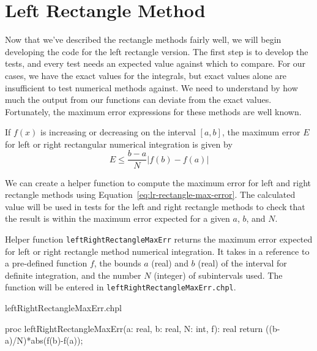 \section{Left Rectangle Method}
\begin{seamlessnote}
  Now that we've described the rectangle methods fairly well, we will begin developing the code 
  for the left rectangle version.  The first step is to develop the tests, and
  every test needs an expected value against which to compare. For our cases, we have the exact
  values for the integrals, but exact values alone are insufficient to test numerical methods
  against. We need to understand by how much the output from our functions can deviate from
  the exact values. Fortunately, the maximum error expressions for these methods are well
  known.
\end{seamlessnote}

If $f(x)$ is increasing or decreasing on the interval $[a,b]$, the maximum error $E$ 
for left or right rectangular numerical integration is given by
\begin{equation}
  E \leq \frac{b-a}{N}\left|f(b)-f(a)\right| \label{eq:lr-rectangle-max-error}
\end{equation}

We can create a helper function to compute the maximum error for left and right rectangle
methods using Equation~\ref{eq:lr-rectangle-max-error}. The calculated value will be used
in tests for the left and right rectangle methods to check that the result is within 
the maximum error expected for a given $a$, $b$, and $N$. 
\begin{enumspec}
\item{} Helper function \lstinline{leftRightRectangleMaxErr} returns the
  maximum error expected for left or right rectangle method numerical integration. It 
  takes in a reference to a pre-defined function $f$, the bounds $a$ (real) and $b$ (real) of the 
  interval for definite integration, and the number $N$ (integer) of subintervals used.
  The function will be entered in \lstinline{leftRightRectangleMaxErr.chpl}.
\end{enumspec}

\begin{chapelhelper}{leftRightRectangleMaxErr.chpl}
  \begin{chapel}
    proc leftRightRectangleMaxErr(a: real, b: real, N: int, f): real{
      return ((b-a)/N)*abs(f(b)-f(a));
    }
  \end{chapel}
\end{chapelhelper}

